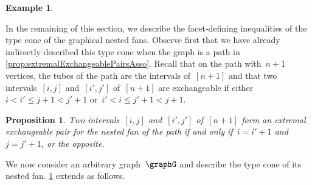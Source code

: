 \documentclass{amsart}
\newtheorem{proposition}[theorem]{Proposition}
\theoremstyle{definition}
\newtheorem{example}[theorem]{Example}
\newcommand{\symdif}{\,\triangle\,} %
\begin{document}
\begin{example}
\medskip
\end{example}

In the remaining of this section, we describe the facet-defining inequalities of the type cone of the graphical nested fans.
Observe first that we have already indirectly described this type cone when the graph is a path in \cref{prop:extremalExchangeablePairsAsso}.
Recall that on the path with~$n+1$ vertices, the tubes of the path are the intervals of~$[n+1]$ and that two intervals~$[i,j]$ and~$[i',j']$ of~$[n+1]$ are exchangeable if either~${i < i' \le j+1 < j'+1}$ or~${i' < i \le j'+1 < j+1}$.

\begin{proposition}
\label{prop:extremalExchangeablePairsA}
Two intervals~$[i,j]$ and~$[i',j']$ of~$[n+1]$ form an extremal exchangeable pair for the nested fan of the path if and only if~$i = i'+1$ and~$j = j'+1$, or the opposite.
\end{proposition}

We now consider an arbitrary graph~$\graphG$ and describe the type cone of its nested fan.
\cref{prop:extremalExchangeablePairsA} extends as follows.
\end{document}
